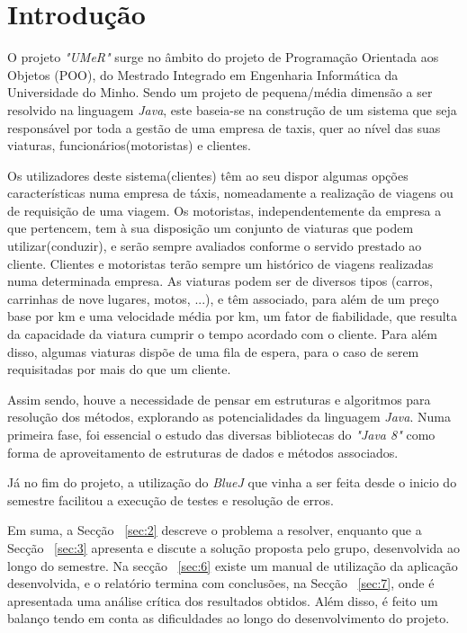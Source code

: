 \documentclass[a4paper]{article}
\begin{document}
\pagebreak
\tableofcontents

\pagebreak
\section{Introdução}
\label{sec:1}


\hspace{3mm} O projeto \emph{"UMeR"} surge no âmbito do projeto de Programação Orientada aos Objetos (POO), do Mestrado Integrado em Engenharia Informática da Universidade do Minho. Sendo um projeto de pequena/média dimensão a ser resolvido na linguagem \emph{Java}, este baseia-se na construção de um sistema que seja responsável por toda a gestão de uma empresa de taxis, quer ao nível das suas viaturas, funcionários(motoristas) e clientes.
\par Os utilizadores deste sistema(clientes) têm ao seu dispor algumas opções características numa empresa de táxis, nomeadamente a realização de viagens ou de requisição de uma viagem. Os motoristas, independentemente da empresa a que pertencem, tem à sua disposição um conjunto de viaturas que podem utilizar(conduzir), e serão sempre avaliados conforme o servido prestado ao cliente. Clientes e motoristas terão sempre um histórico de viagens realizadas numa determinada empresa. 
As viaturas podem ser de diversos tipos (carros, carrinhas de nove lugares, motos, ...), e têm associado, para além de um preço base por km e uma velocidade média por km, um fator de fiabilidade, que resulta da capacidade da viatura cumprir o tempo acordado com o cliente. Para além disso, algumas viaturas dispõe de uma fila de espera, para o caso de serem requisitadas por mais do que um cliente.
\par Assim sendo, houve a necessidade de pensar em estruturas e algoritmos para resolução dos métodos, explorando as potencialidades da linguagem \emph{Java}. Numa primeira fase, foi essencial o estudo das diversas bibliotecas do \emph{"Java 8"} como forma de aproveitamento de estruturas de dados e métodos associados.
\par Já no fim do projeto, a utilização do \emph{BlueJ} que vinha a ser feita desde o inicio do semestre facilitou  a execução de testes e resolução de erros.
\par Em suma, a Secção ~\ref{sec:2} descreve o problema a resolver, enquanto que a Secção ~\ref{sec:3} apresenta e discute a solução proposta pelo grupo, desenvolvida ao longo do semestre. Na secção ~\ref{sec:6} existe um manual de utilização da aplicação desenvolvida, e o relatório termina com conclusões, na  Secção ~\ref{sec:7}, onde é apresentada uma análise crítica dos resultados obtidos. Além disso, é feito um balanço tendo em conta as dificuldades ao longo do desenvolvimento do projeto.
\end{document}

